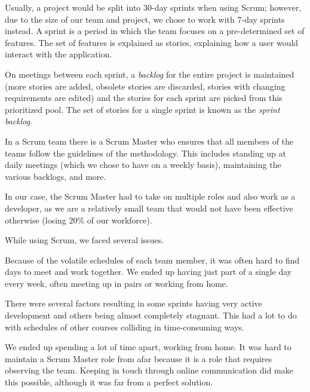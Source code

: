Usually, a project would be split into 30-day sprints when using Scrum; however, due to the size of
our team and project, we chose to work with 7-day sprints instead. A sprint is a period in which the
team focuses on a pre-determined set of features. The set of features is explained as stories,
explaining how a user would interact with the application.

On meetings between each sprint, a \emph{backlog} for the entire project is maintained (more stories are
added, obsolete stories are discarded, stories with changing requirements are edited) and the stories
for each sprint are picked from this prioritized pool. The set of stories for a single sprint is known
as the \emph{sprint backlog}.

In a Scrum team there is a Scrum Master who ensures that all members of the teams follow the guidelines
of the methodology. This includes standing up at daily meetings (which we chose to have on a weekly basis),
maintaining the various backlogs, and more.

In our case, the Scrum Master had to take on multiple roles and also work as a developer, as we are a relatively
small team that would not have been effective otherwise (losing 20\% of our workforce).

While using Scrum, we faced several issues.

Because of the volatile schedules of each team member, it was often hard to find days to meet and work
together. We ended up having just part of a single day every week, often meeting up in pairs or working
from home.

There were several factors resulting in some sprints having very active development and others being almost
completely stagnant. This had a lot to do with schedules of other courses colliding in
time-consuming ways.

We ended up spending a lot of time apart, working from home. It was hard to maintain a Scrum Master role from
afar because it is a role that requires observing the team. Keeping in touch through online communication did
make this possible, although it was far from a perfect solution.
